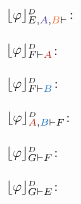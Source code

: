 \begin{example}
\begin{multicols}{3}
{$\projectionDefinitional{\varphi}{E, \hD{A}, \hC{B} \seq }$:
\begin{small}
\begin{prooftree}
 
		 
		 
	 
\end{prooftree}
\end{small}
}
\end{multicols}




\begin{multicols}{3}{
$\projectionDefinitional{\varphi}{F \seq \hA{A}}$:
\begin{prooftree}
 
 
 
\end{prooftree}

$\projectionDefinitional{\varphi}{F \seq \hB{B}}$:
\begin{prooftree}
 
 
 
\end{prooftree}

$\projectionDefinitional{\varphi}{\hA{A}, \hB{B} \seq F}$:
\begin{prooftree}
		 
	 
\end{prooftree}
}
\end{multicols}





\begin{multicols}{3}{
$\projectionDefinitional{\varphi}{G \seq F}$:
\begin{prooftree}
 
 
 
\end{prooftree}

$\projectionDefinitional{\varphi}{G \seq E}$:
\begin{prooftree}
 
 
 
\end{prooftree}

}
\end{multicols}
\end{example}
